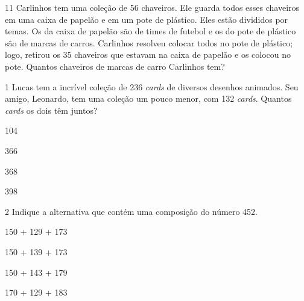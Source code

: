 \num{11} Carlinhos tem uma coleção de 56 chaveiros. Ele guarda todos esses
chaveiros em uma caixa de papelão e em um pote de plástico. Eles estão
divididos por temas. Os da caixa de papelão são de times de futebol e os
do pote de plástico são de marcas de carros. Carlinhos resolveu colocar
todos no pote de plástico; logo, retirou os 35 chaveiros que estavam na
caixa de papelão e os colocou no pote. Quantos chaveiros de marcas de
carro Carlinhos tem?


\pagebreak
{}

\num{1} Lucas tem a incrível coleção de 236 \emph{cards} de diversos desenhos
animados. Seu amigo, Leonardo, tem uma coleção um pouco menor, com 132
\emph{cards}. Quantos \emph{cards} os dois têm juntos?

\begin{minipage}{.5\textwidth}
\begin{escolha}
\item 104

\item 366

\item 368

\item 398
\end{escolha}
\end{minipage}

\num{2} Indique a alternativa que contém uma composição do número 452.

\begin{minipage}{.5\textwidth}
\begin{escolha}
\item 150 + 129 + 173

\item 150 + 139 + 173

\item 150 + 143 + 179

\item 170 + 129 + 183
\end{escolha}
\end{minipage}

